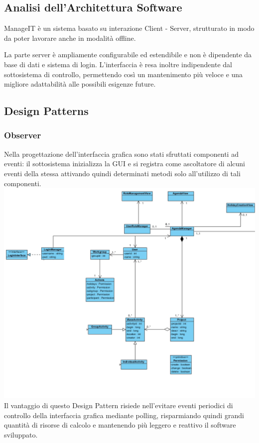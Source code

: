 \documentclass[12pt]{scrartcl}
\begin{document}
\subsection{Analisi dell'Architettura Software}
ManageIT \`e un sistema basato su interazione Client - Server, strutturato
in modo da poter lavorare anche in modalit\`a offline.

La parte server \`e ampliamente configurabile ed estendibile e non \`e dipendente
da base di dati e sistema di login.
L'interfaccia \`e resa inoltre indipendente dal sottosistema di controllo,
permettendo cos\`i un mantenimento pi\`u veloce e una migliore adattabilit\`a
alle possibili esigenze future.

\subsection{Design Patterns}
\subsubsection{Observer}
    Nella progettazione dell'interfaccia grafica sono stati sfruttati
    componenti ad eventi: il sottosistema inizializza la GUI e si registra
    come ascoltatore di alcuni eventi della stessa attivando quindi 
    determinati metodi solo all'utilizzo di tali componenti.\\
    \includegraphics[scale=0.40]{0.png}
Il vantaggio di questo Design Pattern risiede nell'evitare eventi
periodici di controllo della interfaccia grafica mediante polling,
risparmiando quindi grandi quantit\`a di risorse di calcolo e mantenendo
pi\`u leggero e reattivo il software sviluppato.
\end{document}
